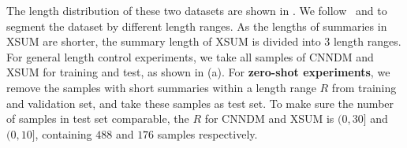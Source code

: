 The length distribution of these two datasets are shown in . 
We follow~\citet{LiuLZ18} and \citet{Proto20}
to segment the dataset by different length ranges.
As the lengths of summaries in XSUM are shorter, 
the summary length of XSUM is divided into 3 length ranges.
For general length control experiments,
we take all samples of CNNDM and XSUM for training and test, as shown in  (a).
For \textbf{zero-shot experiments}, 
we remove the samples with short summaries within a length range $R$ from training and validation set, and take these samples as test set.
To make sure the number of samples in test set comparable,
the $R$ for CNNDM and XSUM is $(0,30]$ and $(0,10]$, containing $488$ and $176$ samples respectively.
\cut{%
\begin{table}[th]
	\scriptsize
	\centering
		\begin{tabular}{|c|r|rrr|rrr|}
			\hline
			\multirow{2}{*}{\bf Data} & \multirow{2}{*}{\bf Length} & \multicolumn{3}{c|}{General} & \multicolumn{3}{c|}{Zero-shot} \\ \cline{3-8}
			& & \bf Train & \bf Val & \bf Test & \bf Train & \bf Val & \bf Test \\ 
			\hline
			\multirow{7}{*}{CNNDM} 
			&$(0,10]$ & 421 &1 &1 &-&-&1\\
			& $(10,30]$ & 20,429&573 & 487 & & &\\
			& $(30,50]$ & 114,521 &4,255&4,144 & & &\\
			& $(50,70]$& 101,461 & 4,746 &4,380 & & &\\
			& $(70,90]$ & 31,470 & 2,321 & 1,509& & &\\
			& $(90,+\infty)$ & 18,925&1,472 &969 & & &\\
			\cline{2-8}
			&Total &287,228&13,369&11,491 & & &\\
			\hline
			\multirow{4}{*}{XSUM} 
			&$(0,10]$ & 3,049 & 167 & 176 & & &\\
			& $(10,30]$ & 193,237 & 10,732 & 10,729 & & &\\
			& $(30,+\infty)$ & 77,60 & 433 & 429 & & &\\
			\cline{2-8}
			&Total &204,046&11,332&11,334& & &\\
			\hline
		\end{tabular}
		\caption{The number of summaries within different length ranges.}
	\label{tab:lendis}
\end{table}
}%

